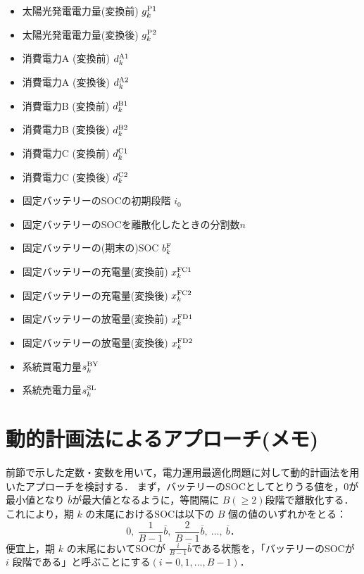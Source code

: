 \documentclass{jarticle}
\newcommand{\IB}{$\bullet$}
\newcommand{\IC}{$\circ$}
\begin{document}
 \begin{itemize}
  \item[\IB] 太陽光発電電力量(変換前) $g^{\rm P1}_{k}$
  \item[\IC] 太陽光発電電力量(変換後) $g^{\rm P2}_{k}$
  \item[\IC] 消費電力A (変換前) $d^{\rm A1}_{k}$
  \item[\IB] 消費電力A (変換後) $d^{\rm A2}_{k}$
  \item[\IC] 消費電力B (変換前) $d^{\rm B1}_{k}$
  \item[\IB] 消費電力B (変換後) $d^{\rm B2}_{k}$
  \item[\IC] 消費電力C (変換前) $d^{\rm C1}_{k}$
  \item[\IB] 消費電力C (変換後) $d^{\rm C2}_{k}$
  \item[\IB] 固定バッテリーのSOCの初期段階 $i_{0}$
  \item[\IB] 固定バッテリーのSOCを離散化したときの分割数$n$
  \item[\IC] 固定バッテリーの(期末の)SOC $b^{\rm F}_{k}$
  \item[\IC] 固定バッテリーの充電量(変換前) $x^{\rm FC1}_{k}$
  \item[\IC] 固定バッテリーの充電量(変換後) $x^{\rm FC2}_{k}$
  \item[\IC] 固定バッテリーの放電量(変換前) $x^{\rm FD1}_{k}$
  \item[\IC] 固定バッテリーの放電量(変換後) $x^{\rm FD2}_{k}$ \\[-2.5ex]

  \item[\IC] 系統買電力量$s^{\rm BY}_{k}$
  \item[\IC] 系統売電力量$s^{\rm SL}_{k}$
  
\end{itemize}


\section{動的計画法によるアプローチ(メモ)}

前節で示した定数・変数を用いて，電力運用最適化問題に対して動的計画法を用いたアプローチを検討する．
まず，バッテリーのSOCとしてとりうる値を，0が最小値となり $\overline{b}$が最大値となるように，等間隔に $B( \geq 2)$段階で離散化する．これにより，期 \(k\) の末尾におけるSOCは以下の \(B\) 個の値のいずれかをとる：
\[
0,\ \frac{1}{B-1}\overline{b},\ \frac{2}{B-1}\overline{b},\ \dots,\ \overline{b}．
\]
便宜上，期 $k$ の末尾においてSOCが $\frac{i}{B-1}\overline{b}$である状態を，「バッテリーのSOCが $i$ 段階である」と呼ぶことにする$(i=0,1,\dots ,  B - 1)$．
\end{document}
